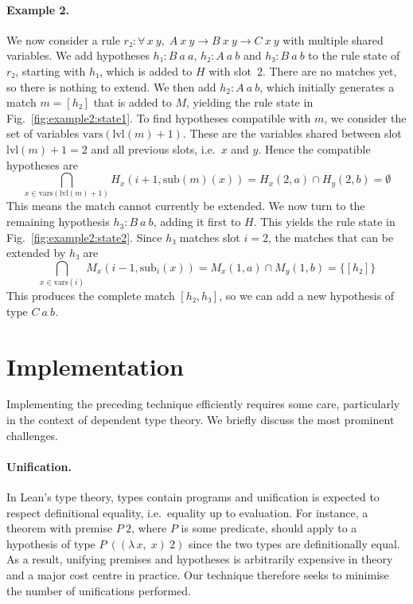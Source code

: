 \documentclass[runningheads]{llncs}
\newcommand{\Lam}[2]{\ensuremath{\lambda\, #1,\; #2}}
\newcommand{\All}[2]{\ensuremath{\forall\, #1,\; #2}}
\newcommand{\vars}{\ensuremath{\mathrm{vars}}}
\newcommand{\sub}{\ensuremath{\mathrm{sub}}}
\newcommand{\lvl}{\ensuremath{\mathrm{lvl}}}
\begin{document}
\paragraph{Example 2.}
We now consider a rule $r₂ : \All{x~y}{A~x~y → B~x~y → C~x~y}$ with multiple shared variables.
We add hypotheses $h₁ : B~a~a$, $h₂ : A~a~b$ and $h₃ : B~a~b$ to the rule state of $r₂$, starting with $h₁$, which is added to $H$ with slot~2.
There are no matches yet, so there is nothing to extend.
We then add $h_2 : A~a~b$, which initially generates a match $m = [h₂]$ that is added to $M$, yielding the rule state in Fig.~\ref{fig:example2:state1}.
To find hypotheses compatible with $m$, we consider the set of variables $\vars(\lvl(m) + 1)$.
These are the variables shared between slot~$\lvl(m) + 1 = 2$ and all previous slots, i.e.\ $x$ and $y$.
Hence the compatible hypotheses are
\[
  \bigcap_{x \in \vars(\lvl(m) + 1)} H_{x}(i + 1, \sub(m)(x)) = H_{x}(2, a) \cap H_{y}(2, b) = \emptyset
\]
This means the match cannot currently be extended.
We now turn to the remaining hypothesis $h_3 : B~a~b$, adding it first to $H$.
This yields the rule state in Fig.~\ref{fig:example2:state2}.
Since $h₃$ matches slot $i = 2$, the matches that can be extended by $h₃$ are
\[
  \bigcap_{x \in \vars(i)} M_{x}(i - 1, \sub_{i}(x)) = M_{x}(1, a) \cap M_{y}(1, b) = \{[h₂]\}
\]
This produces the complete match $[h₂, h₃]$, so we can add a new hypothesis of type $C~a~b$.

\section{Implementation}%
\label{sec:implementation}

Implementing the preceding technique efficiently requires some care, particularly in the context of dependent type theory.
We briefly discuss the most prominent challenges.

\paragraph{Unification.}
In Lean's type theory, types contain programs and unification is expected to respect definitional equality, i.e.\ equality up to evaluation.
For instance, a theorem with premise $P~2$, where $P$ is some predicate, should apply to a hypothesis of type $P~((\Lam{x}{x})~2)$ since the two types are definitionally equal.
As a result, unifying premises and hypotheses is arbitrarily expensive in theory and a major cost centre in practice.
Our technique therefore seeks to minimise the number of unifications performed.
\end{document}
